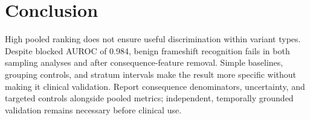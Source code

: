 \section{Conclusion}
High pooled ranking does not ensure useful discrimination within variant types. Despite blocked AUROC of 0.984, benign frameshift recognition fails in both sampling analyses and after consequence-feature removal. Simple baselines, grouping controls, and stratum intervals make the result more specific without making it clinical validation. Report consequence denominators, uncertainty, and targeted controls alongside pooled metrics; independent, temporally grounded validation remains necessary before clinical use.
